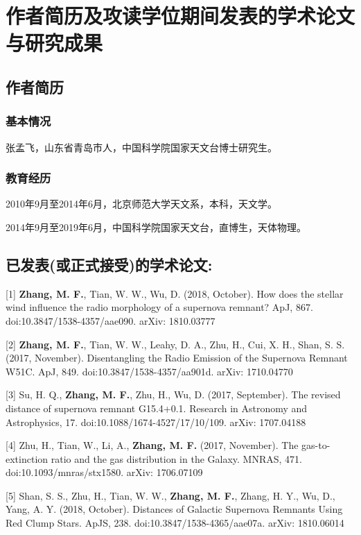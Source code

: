 \chapter{作者简历及攻读学位期间发表的学术论文与研究成果}


\section*{作者简历}

\subsection*{基本情况}

张孟飞，山东省青岛市人，中国科学院国家天文台博士研究生。

\subsection*{教育经历}

2010年9月至2014年6月，北京师范大学天文系，本科，天文学。

2014年9月至2019年6月，中国科学院国家天文台，直博生，天体物理。

\section*{已发表(或正式接受)的学术论文:}

[1] \textbf{Zhang, M. F.}, Tian, W. W., Wu, D. (2018, October). How does the stellar wind influence the radio morphology of a supernova
remnant? ApJ, 867. doi:10.3847/1538-4357/aae090. arXiv: 1810.03777

[2] \textbf{Zhang, M. F.}, Tian, W. W., Leahy, D. A., Zhu, H., Cui, X. H., Shan, S. S. (2017, November). Disentangling the Radio Emission of the
Supernova Remnant W51C. ApJ, 849. doi:10.3847/1538-4357/aa901d. arXiv: 1710.04770

[3] Su, H. Q., \textbf{Zhang, M. F.}, Zhu, H., Wu, D. (2017, September). The revised distance of supernova remnant G15.4+0.1. Research in
Astronomy and Astrophysics, 17. doi:10.1088/1674-4527/17/10/109. arXiv: 1707.04188

[4] Zhu, H., Tian, W., Li, A., \textbf{Zhang, M. F.} (2017, November). The gas-to-extinction ratio and the gas distribution in the Galaxy.
MNRAS, 471. doi:10.1093/mnras/stx1580. arXiv: 1706.07109

[5] Shan, S. S., Zhu, H., Tian, W. W., \textbf{Zhang, M. F.}, Zhang, H. Y., Wu, D., Yang, A. Y. (2018, October). Distances of Galactic Supernova
Remnants Using Red Clump Stars. ApJS, 238. doi:10.3847/1538-4365/aae07a. arXiv: 1810.06014

